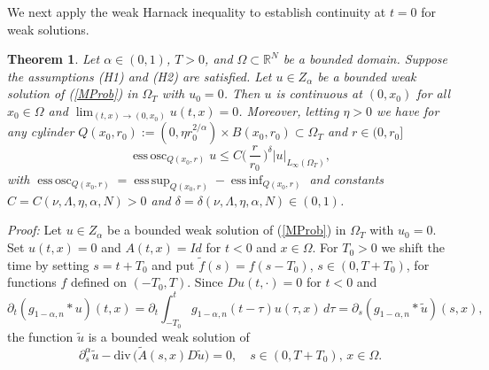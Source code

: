 \documentclass[10pt]{article}
\newtheorem{satz}{Theorem}[section]
\newcommand{\iR}{\mathbb{R}}
\DeclareMathOperator*{\eosc}{ess\,osc}
\DeclareMathOperator*{\esup}{ess\,sup}
\DeclareMathOperator*{\einf}{ess\,inf}
\begin{document}
We next apply the weak Harnack inequality to establish continuity at
$t=0$ for weak solutions.
\begin{satz} \label{Hoeldert=0}
Let $\alpha\in(0,1)$, $T>0$, and $\Omega\subset \iR^N$ be a bounded
domain. Suppose the assumptions (H1) and (H2) are satisfied. Let
$u\in Z_\alpha$ be a bounded weak solution of (\ref{MProb}) in
$\Omega_T$ with $u_0=0$. Then $u$ is continuous at $(0,x_0)$ for all
$x_0\in \Omega$ and $\lim_{(t,x)\to (0,x_0)}u(t,x)=0$. Moreover,
letting $\eta>0$ we have for any cylinder $Q(x_0,r_0):=(0,\eta
r_0^{2/\alpha})\times B(x_0,r_0)\subset \Omega_T$ and $r\in (0,r_0]$
\begin{equation} \label{oscest}
\eosc_{Q(x_0,r)} u \le C\Big(\,\frac{r}{r_0}\,\Big)^\delta
|u|_{L_\infty(\Omega_T)},
\end{equation}
with $\eosc_{Q(x_0,r)}=\esup_{Q(x_0,r)}-\einf_{Q(x_0,r)}$ and
constants $C=C(\nu,\Lambda,\eta,\alpha,N)>0$ and
$\delta=\delta(\nu,\Lambda,\eta,\alpha,N)\in (0,1)$.
\end{satz}
{\em Proof:} Let $u\in Z_\alpha$ be a bounded weak solution of
(\ref{MProb}) in $\Omega_T$ with $u_0=0$. Set $u(t,x)=0$ and
$A(t,x)=Id$ for $t<0$ and $x\in \Omega$. For $T_0>0$ we shift the
time by setting $s=t+T_0$ and put $\tilde{f}(s)=f(s-T_0)$, $s\in
(0,T+T_0)$, for functions $f$ defined on $(-T_0,T)$. Since
$Du(t,\cdot)=0$ for $t<0$ and
\[
\partial_t(g_{1-\alpha,n}\ast u)(t,x)=\partial_t\int_{-T_0}^t
g_{1-\alpha,n}(t-\tau)u(\tau,x)\,d\tau=\partial_s(g_{1-\alpha,n}\ast
\tilde{u})(s,x),\] the function $\tilde{u}$ is a bounded weak
solution of
\[
\partial_s^\alpha \tilde{u}-\mbox{div}\,\big(\tilde{A}(s,x)D\tilde{u}\big)=0,\quad s\in (0,T+T_0),\,x\in
\Omega.
\]
\end{document}
